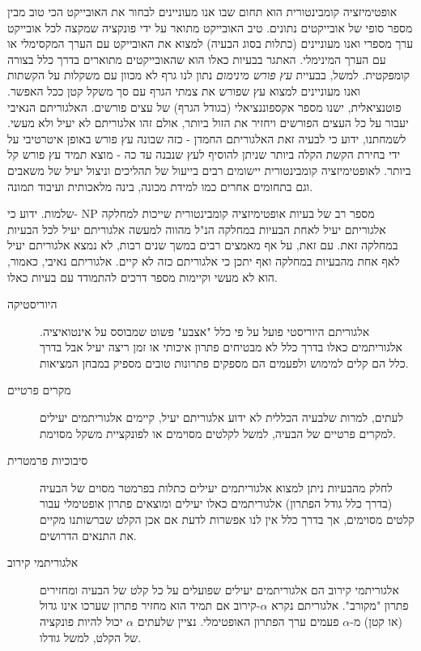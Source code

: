 \begin{hebrew}
אופטימיזציה קומבינטורית הוא תחום שבו אנו מעוניינים לבחור את האובייקט הכי טוב מבין מספר סופי של אובייקטים נתונים.
טיב האובייקט מתואר על ידי פונקציה שמקצה לכל אובייקט ערך מספרי ואנו מעוניינים (כתלות בסוג הבעיה) למצוא את האובייקט עם הערך המקסימלי או עם הערך המינימלי.
האתגר בבעיות כאלו הוא שהאובייקטים מתוארים בדרך כלל בצורה קומפקטית.
למשל, בבעיית
\emph{עץ פורש מינימום}
נתון לנו גרף לא מכוון עם משקלות על הקשתות ואנו מעוניינים למצוא עץ שפורש את צמתי הגרף עם סך משקל קטן ככל האפשר.
פוטנציאלית, ישנו מספר אקספוננציאלי (בגודל הגרף) של עצים פורשים.
האלגוריתם הנאיבי יעבור על כל העצים הפורשים ויחזיר את הזול ביותר, אולם זהו אלגוריתם לא יעיל ולא מעשי.
לשמחתנו, ידוע כי לבעיה זאת האלגוריתם החמדן - כזה שבונה עץ פורש באופן איטרטיבי על ידי בחירת הקשת הקלה ביותר שניתן להוסיף לעץ שנבנה עד כה - מוצא תמיד עץ פורש קל ביותר.
לאופטימיזציה קומבינטורית יישומים רבים בייעול של תהליכים וניצול יעיל של משאבים וגם בתחומים אחרים כמו למידת מכונה, בינה מלאכותית ועיבוד תמונה.

מספר רב של בעיות אופטימיזציה קומבינטורית שייכות למחלקה
$\text{NP}$
-שלמות.
ידוע כי אלגוריתם יעיל לאחת הבעיות במחלקה הנ"ל מהווה למעשה אלגוריתם יעיל לכל הבעיות במחלקה זאת.
עם זאת, על אף מאמצים רבים במשך שנים רבות, לא נמצא אלגוריתם יעיל לאף אחת מהבעיות במחלקה ואף יתכן כי אלגוריתם כזה לא קיים.
אלגוריתם נאיבי, כאמור, הוא לא מעשי וקיימות מספר דרכים להתמודד עם בעיות כאלו.

\begin{description}
\item[\texthebrew{היוריסטיקה}]
אלגוריתם היוריסטי פועל על פי כלל "אצבע" פשוט שמבוסס על אינטואיציה.
אלגוריתמים כאלו בדרך כלל לא מבטיחים פתרון איכותי או זמן ריצה יעיל אבל בדרך כלל הם קלים למימוש ולפעמים הם מספקים פתרונות טובים מספיק במבחן המציאות.
\item[\texthebrew{מקרים פרטיים}]
לעתים, למרות שלבעיה הכללית לא ידוע אלגוריתם יעיל, קיימים אלגוריתמים יעילים למקרים פרטיים של הבעיה, למשל לקלטים מסוימים או לפונקציית משקל מסוימת.
\item[\texthebrew{סיבוכיות פרמטרית}]
לחלק מהבעיות ניתן למצוא אלגוריתמים יעילים כתלות בפרמטר מסוים של הבעיה (בדרך כלל גודל הפתרון) אלגוריתמים כאלו יעילים ומוצאים פתרון אופטימלי עבור קלטים מסוימים,
אך בדרך כלל אין לנו אפשרות לדעת אם אכן הקלט שברשותנו מקיים את התנאים הדרושים.
\item[\texthebrew{אלגוריתמי קירוב}]
אלגוריתמי קירוב הם אלגוריתמים יעילים שפועלים על כל קלט של הבעיה ומחזירים פתרון "מקורב".
אלגוריתם נקרא $\alpha$-קירוב אם תמיד הוא מחזיר פתרון שערכו אינו גדול (או קטן) מ-$\alpha$ פעמים ערך הפתרון האופטימלי.
נציין שלעתים $\alpha$ יכול להיות פונקציה של הקלט, למשל גודלו.
\end{description}


\end{hebrew}
